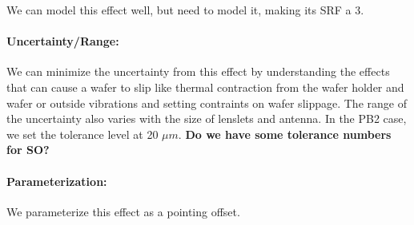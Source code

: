 We can model this effect well, but need to model it, making its SRF a 3.

\paragraph{Uncertainty/Range:}
We can minimize the uncertainty from this effect by understanding the effects that can cause a wafer to slip like thermal contraction from the wafer holder and wafer or outside vibrations and setting contraints on wafer slippage. The range of the uncertainty also varies with the size of lenslets and antenna. In the PB2 case, we set the tolerance level at 20 $\mu m$. \textbf{Do we have some tolerance numbers for SO?}

\paragraph{Parameterization:}
We parameterize this effect as a pointing offset.
